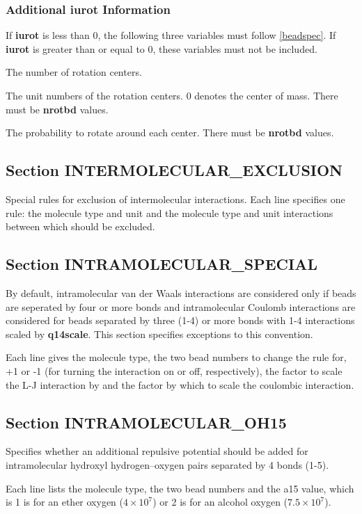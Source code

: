 \documentclass[12pt,letterpaper]{article}
\begin{document}
\subsubsection{Additional {\bf iurot} Information}
If {\bf iurot} is less than 0, the following three variables
must follow \ref{beadspec}. If {\bf iurot} is greater than
or equal to 0, these variables must not be included.

 The number of rotation centers.

 The unit numbers of the rotation
centers. 0 denotes the center of mass. There must be {\bf
  nrotbd} values.

 The probability to rotate around
each center. There must be {\bf nrotbd} values.

\subsection{Section \textbf{INTERMOLECULAR\_EXCLUSION}}
Special rules for exclusion of intermolecular interactions.
Each line specifies one rule: the molecule type and unit and
the molecule type and unit interactions between which should
be excluded.

\subsection{Section \textbf{INTRAMOLECULAR\_SPECIAL}}
\label{intra_special}
By default, intramolecular van der Waals interactions are
considered only if beads are seperated by four or more bonds
and intramolecular Coulomb interactions are considered for
beads separated by three (1-4) or more bonds with 1-4
interactions scaled by {\bf q14scale}. This section
specifies exceptions to this convention.

Each line gives the molecule type, the two bead numbers to
change the rule for, +1 or -1 (for turning the interaction
on or off, respectively), the factor to scale the L-J
interaction by and the factor by which to scale the
coulombic interaction.

\subsection{Section \textbf{INTRAMOLECULAR\_OH15}}
Specifies whether an additional repulsive potential should
be added for intramolecular hydroxyl hydrogen--oxygen pairs
separated by 4 bonds (1-5).

Each line lists the molecule type, the two bead numbers and
the a15 value, which is 1 is for an ether oxygen ($4\times
10^7$) or 2 is for an alcohol oxygen ($7.5\times 10^7$).
\end{document}
